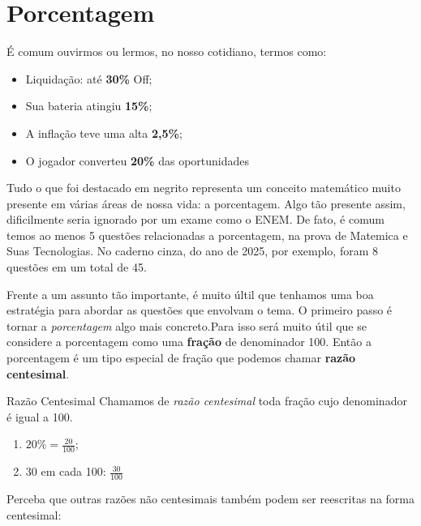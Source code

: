 \documentclass[12pt, a4paper, brazil]{abntex2}
\begin{document}
    \textual\pagestyle{myHeader}
    \section*{Porcentagem}

    É comum ouvirmos ou lermos, no nosso cotidiano, termos como:

    \begin{itemize}
        \item Liquidação: até \textbf{30\%} Off;
        \item Sua bateria atingiu \textbf{15\%};
        \item A inflação teve uma alta \textbf{2,5\%};
        \item O jogador converteu \textbf{20\%} das oportunidades
    \end{itemize}

    Tudo o que foi destacado em negrito representa um conceito matemático muito presente em várias áreas de nossa vida: a porcentagem. Algo tão presente assim, dificilmente seria ignorado por um exame como o ENEM. De fato, é comum temos ao menos 5 questões relacionadas a porcentagem, na prova de Matemica e Suas Tecnologias. No caderno cinza, do ano de 2025, por exemplo, foram 8 questões em um total de 45.

    Frente a um assunto tão importante, é muito últil que tenhamos uma boa estratégia para abordar as questões que envolvam o tema. O primeiro passo é tornar a \textit{porcentagem} algo mais concreto.Para isso será muito útil que se considere a porcentagem como uma \textbf{fração} de denominador 100. Então a porcentagem é um tipo especial de fração que podemos chamar \textbf{razão centesimal}.
    \bigskip
    \begin{definicao}{Razão Centesimal}
        Chamamos de \textit{razão centesimal} toda fração cujo denominador é igual a 100.
    \end{definicao}
    \bigskip
    
    \begin{exemplo}
        \hfil\begin{enumerate}[label= (\alph*)]
            \item $20\% = \displaystyle \frac{20}{100}$;
            \item 30 em cada 100: $\displaystyle \frac{30}{100}$
        \end{enumerate}
    \end{exemplo}
    \bigskip
    Perceba que outras razões não centesimais também podem ser reescritas na forma centesimal:
\end{document}
